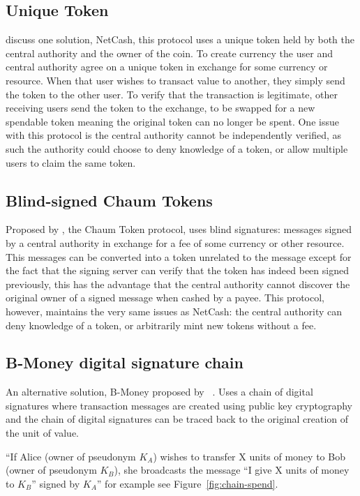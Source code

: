 \subsection{Unique Token} \textcite{netcash} discuss one solution,
NetCash, this protocol uses a
unique token held by both the central authority and the owner of the coin. To
create currency the user and central authority agree on a unique token in
exchange for some currency or resource. When that user wishes to transact value
to another, they simply send the token to the other user.  To verify that the
transaction is legitimate, other receiving users send the token to the exchange,
to be swapped for a new spendable token meaning the original token can no longer
be spent. One issue with this protocol is the central authority cannot be
independently verified, as such the authority could choose to deny knowledge of
a token, or allow multiple users to claim the same token.

\subsection{Blind-signed Chaum Tokens}
Proposed by \textcite{chaum}, the Chaum Token protocol, uses blind signatures: messages signed by a central authority in exchange for a fee of some currency or other resource. This messages can be converted into a token unrelated to the message except for the fact that the signing server can verify that the token has indeed been signed previously, this has the advantage that the central authority cannot discover the original owner of a signed message when cashed by a payee.  This protocol, however, maintains the very same issues as NetCash: the central authority can deny knowledge of a token, or arbitrarily mint new tokens without a fee.

\subsection{B-Money digital signature chain}\label{digital-sig}
An alternative solution, B-Money proposed by ~\textcite{b-money}. Uses a chain of digital signatures where transaction messages are created using public key cryptography and the chain of digital signatures can be traced back to the original creation of the unit of value.

``If Alice (owner of pseudonym $K_A$) wishes to transfer X units of money to Bob (owner of pseudonym $K_B$), she broadcasts the message ``I give X units of money to $K_B$'' signed by $K_A$'' for example see Figure~\ref{fig:chain-spend}.

